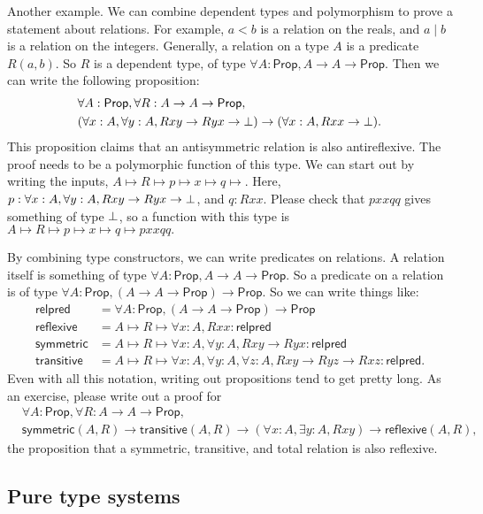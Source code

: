 \documentclass[11pt,paper=letter]{scrartcl}
\renewcommand{\sf}{\mathsf}
\newcommand{\prop}{\mathsf{Prop}}
\begin{document}
Another example. We can combine dependent types and polymorphism to prove a statement about relations. For example, $a < b$ is a relation on the reals, and $a \mid b$ is a relation on the integers. Generally, a relation on a type $A$ is a predicate $R(a, b)$. So $R$ is a dependent type, of type $\forall A: \prop, A \to A \to \prop$. Then we can write the following proposition:
\begin{align*}
&\forall A: \prop, \forall R: A \to A \to \prop,\\
&(\forall x: A, \forall y: A, Rxy \to Ryx \to \false) \to (\forall x: A, Rxx \to \false).
\end{align*}
This proposition claims that an antisymmetric relation is also antireflexive. The proof needs to be a polymorphic function of this type. We can start out by writing the inputs, $A \mapsto R \mapsto p \mapsto x \mapsto q \mapsto$. Here, $p : \forall x: A, \forall y: A, Rxy \to Ryx \to \bot$, and $q: Rxx$. Please check that $pxxqq$ gives something of type $\bot$, so a function with this type is $A \mapsto R \mapsto p \mapsto x \mapsto q \mapsto pxxqq.$

By combining type constructors, we can write predicates on relations. A relation itself is something of type $\forall A: \prop, A \to A \to \prop$. So a predicate on a relation is of type $\forall A: \prop, (A \to A \to \prop) \to \prop$. So we can write things like:
\begin{align*}
\sf{relpred} &= \forall A: \prop, (A \to A \to \prop) \to \prop \\
\sf{reflexive} &= A \mapsto R \mapsto \forall x: A, Rxx: \sf{relpred} \\
\sf{symmetric} &= A \mapsto R \mapsto \forall x: A, \forall y: A, Rxy \to Ryx: \sf{relpred} \\
\sf{transitive} &= A \mapsto R \mapsto \forall x: A, \forall y: A, \forall z: A, Rxy \to Ryz \to Rxz: \sf{relpred}.
\end{align*}
Even with all this notation, writing out propositions tend to get pretty long. As an exercise, please write out a proof for
\begin{align*}
&\forall A: \prop, \forall R: A \to A \to \prop,\\
&\sf{symmetric}(A, R) \to \sf{transitive}(A, R) \to (\forall x: A, \exists y: A, Rxy) \to \sf{reflexive}(A, R),
\end{align*}
the proposition that a symmetric, transitive, and total relation is also reflexive.

\subsection{Pure type systems}
\end{document}
